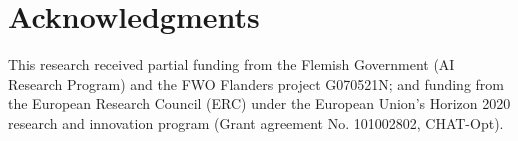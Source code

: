 \section*{Acknowledgments}
This research received partial funding
from the Flemish Government (AI Research Program) and the
FWO Flanders project G070521N; and funding from the European Research Council (ERC) under
the European Union’s Horizon 2020 research and innovation program
(Grant agreement No. 101002802, CHAT-Opt).
